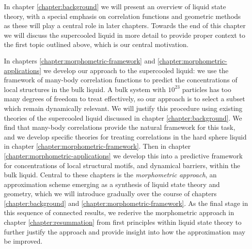 \documentclass[11pt,twoside]{report}
\begin{document}
In chapter \ref{chapter:background} we will present an overview of liquid state theory, with a special emphasis on correlation functions and geometric methods as these will play a central role in later chapters.
Towards the end of this chapter we will discuss the supercooled liquid in more detail to provide proper context to the first topic outlined above, which is our central motivation.

In chapters \ref{chapter:morphometric-framework} and \ref{chapter:morphometric-applications} we develop our approach to the supercooled liquid: we use the framework of many-body correlation functions to predict the concentrations of local structures in the bulk liquid.
A bulk system with $10^{23}$ particles has too many degrees of freedom to treat effectively, so our approach is to select a subset which remain dynamically relevant.
We will justify this procedure using existing theories of the supercooled liquid discussed in chapter \ref{chapter:background}.
We find that many-body correlations provide the natural framework for this task, and we develop specific theories for treating correlations in the hard sphere liquid in chapter \ref{chapter:morphometric-framework}.
Then in chapter \ref{chapter:morphometric-applications} we develop this into a predictive framework for concentrations of local structural motifs, and dynamical barriers, within the bulk liquid.
Central to these chapters is the \emph{morphometric approach}, an approximation scheme emerging as a synthesis of liquid state theory and geometry, which we will introduce gradually over the course of chapters \ref{chapter:background} and \ref{chapter:morphometric-framework}.
As the final stage in this sequence of connected results, we rederive the morphometric approach in chapter \ref{chapter:resummation} from first principles within liquid state theory to further justify the approach and provide insight into how the approximation may be improved.
\end{document}

